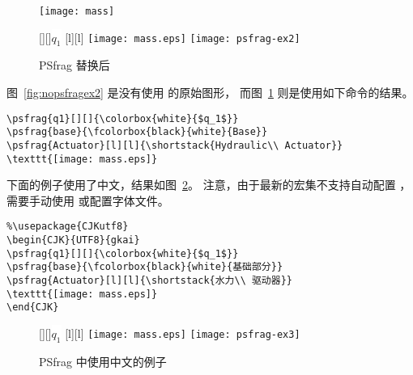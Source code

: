 \begin{figure}
\begin{minipage}[b]{.5\textwidth}
\centering
\texttt{[image: mass]}
\caption{PSfrag 替换前}\label{fig:nopsfragex2}
\par\vspace{0pt}
\end{minipage}%
\begin{minipage}[b]{.5\textwidth}
\centering
\ifdvips
{}[][]{\colorbox{white}{$q_1$}}
[l][l]{}
\texttt{[image: mass.eps]}
\else
\texttt{[image: psfrag-ex2]}
\fi
\caption{PSfrag 替换后}\label{fig:psfragex2}
\par\vspace{0pt}
\end{minipage}
\end{figure}

图~\ref{fig:nopsfragex2} 是没有使用  的原始图形，
而图~\ref{fig:psfragex2} 则是使用如下命令的结果。
\begin{lstlisting}
\psfrag{q1}[][]{\colorbox{white}{$q_1$}}
\psfrag{base}{\fcolorbox{black}{white}{Base}}
\psfrag{Actuator}[l][l]{\shortstack{Hydraulic\\ Actuator}}
\texttt{[image: mass.eps]}
\end{lstlisting}

下面的例子使用了中文，结果如图~\ref{fig:psfragex3}。
注意，由于最新的宏集不支持自动配置 ，
需要手动使用 或配置字体文件。
\begin{lstlisting}
%\usepackage{CJKutf8}
\begin{CJK}{UTF8}{gkai}
\psfrag{q1}[][]{\colorbox{white}{$q_1$}}
\psfrag{base}{\fcolorbox{black}{white}{基础部分}}
\psfrag{Actuator}[l][l]{\shortstack{水力\\ 驱动器}}
\texttt{[image: mass.eps]}
\end{CJK}
\end{lstlisting}

\begin{figure}
\centering
\ifdvips
{}[][]{\colorbox{white}{$q_1$}}
[l][l]{}
\texttt{[image: mass.eps]}
\else
\texttt{[image: psfrag-ex3]}
\fi
\caption{PSfrag {中使用中文的例子}}\label{fig:psfragex3}
\end{figure}

